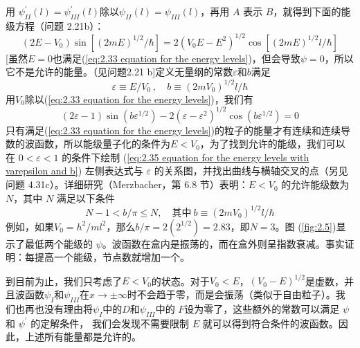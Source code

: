 	用 $\psi^{\prime}_{II}\left(l\right) = \psi^{\prime}_{III}\left(l\right)$除以$\psi_{II}\left(l\right) = \psi_{III}\left(l\right)$，再用 $A$ 表示 $B$，就得到下面的能级方程（问题 2.21b）：
	\begin{equation}
		\left(2E-V_0\right)\sin\left[\left(2mE\right)^{1/2}/\hbar\right] = 2\left(V_0E-E^2\right)^{1/2}\cos \left[\left(2mE\right)^{1/2}l/\hbar\right]
		\label{eq:2.33 equation for the energy levels}
	\end{equation}
	[虽然$E=0$也满足(\ref{eq:2.33 equation for the energy levels})，但会导致$\psi=0$，所以它不是允许的能量。（见问题2.21 b]定义无量纲的常数$\varepsilon$和$b$满足
	\begin{equation}
		\varepsilon \equiv E/V_0\:, \quad b \equiv \left(2mV_0\right)^{1/2}l/\hbar
		\label{eq: 2.34 definition of varepsilon and b}
	\end{equation}
	用$V_0$除以(\ref{eq:2.33 equation for the energy levels})，我们有
	\begin{equation}
		\left(2\varepsilon-1\right)\sin\left(b\varepsilon^{1/2}\right) - 2\left(\varepsilon - \varepsilon^2 \right)^{1/2}\cos\left(b\varepsilon^{1/2}\right) = 0
		\label{eq:2.35 equation for the energy levels with varepsilon and b}
	\end{equation}
	只有满足(\ref{eq:2.33 equation for the energy levels})的粒子的能量才有连续和连续导数的波函数，所以能级量子化的条件为$E<V_0$，为了找到允许的能级，我们可以在 $0<\varepsilon<1$ 的条件下绘制 (\ref{eq:2.35 equation for the energy levels with varepsilon and b}) 左侧表达式与 $\varepsilon$ 的关系图，并找出曲线与横轴交叉的点（另见问题 4.31c）。详细研究（Merzbacher，第 6.8 节）表明：$E<V_0$ 的允许能级数为 $N$，其中 $N$ 满足以下条件
	\begin{equation}
		N-1 < b/\pi \le N, \quad \text{其中}\: b \equiv \left(2mV_0\right)^{1/2}l /\hbar
		\label{eq:2.36 requirement for allowed energy levels' number N}
	\end{equation}
	例如，如果$V_0 = h^2/ml^2$，那么$b/\pi = 2\left(2^{1/2}\right) = 2.83$，即$N=3$。图 (\ref{fig:2.5})显示了最低两个能级的 $\psi$。波函数在盒内是振荡的，而在盒外则呈指数衰减。事实证明：每提高一个能级，节点数就增加一个。

	到目前为止，我们只考虑了$E<V_0$的状态。对于$V_0<E$，$\left(V_0-E\right)^{1/2}$是虚数，并且波函数$\psi_I$和$\psi_{III}$在$x \to \pm \infty$时不会趋于零，而是会振荡（类似于自由粒子）。我们也再也没有理由将$\psi_I$中的$D$和$\psi_{III}$中的 $F$设为零了，这些额外的常数可以满足 $\psi$ 和 $\psi^{\prime}$ 的定解条件，
	我们会发现不需要限制 $E$ 就可以得到符合条件的波函数。因此，上述所有能量都是允许的。

